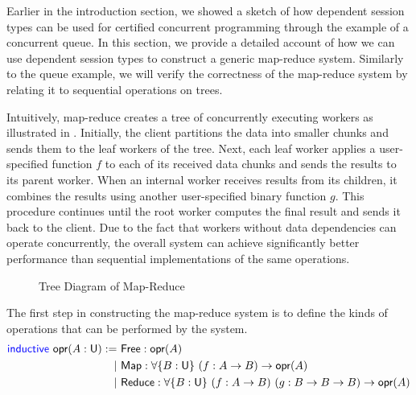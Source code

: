 Earlier in the introduction section, we showed a sketch of how dependent session types
can be used for certified concurrent programming through the example of a concurrent queue.
In this section, we provide a detailed account of how we can use dependent session types
to construct a generic map-reduce system. Similarly to the queue example, we will verify
the correctness of the map-reduce system by relating it to sequential operations on trees.

Intuitively, map-reduce creates a tree of concurrently executing workers as illustrated in
. Initially, the client partitions the data into smaller chunks and sends them to
the leaf workers of the tree. Next, each leaf worker applies a user-specified
function $f$ to each of its received data chunks and sends the results to its parent worker.
When an internal worker receives results from its children, it combines the results using another
user-specified binary function $g$. This procedure continues until the root worker computes
the final result and sends it back to the client. Due to the fact that workers without
data dependencies can operate concurrently, the overall system can achieve significantly better
performance than sequential implementations of the same operations.
\vspace{-0.3em}
\begin{figure}[H]
\vspace{-0.5em}
\caption{Tree Diagram of Map-Reduce}
\label{fig:map-reduce}
\end{figure}

The first step in constructing the map-reduce system is to define the kinds of operations
that can be performed by the system.
\begingroup
\small
\addtolength{\jot}{-0.2em}
\begin{align*}
  \textsf{\color{blue}inductive}\ \textsf{opr}(A : \textsf{U}) :=\ &\textsf{Free}  : \textsf{opr}(A) \\
  \mid\ &\textsf{Map}   : \forall \{B : \textsf{U}\}\ (f : A \rightarrow B) \rightarrow \textsf{opr}(A) \\
  \mid\ &\textsf{Reduce}: \forall \{B : \textsf{U}\}\ (f : A \rightarrow B)\ (g : B \rightarrow B \rightarrow B) \rightarrow \textsf{opr}(A)
\end{align*}
\endgroup

